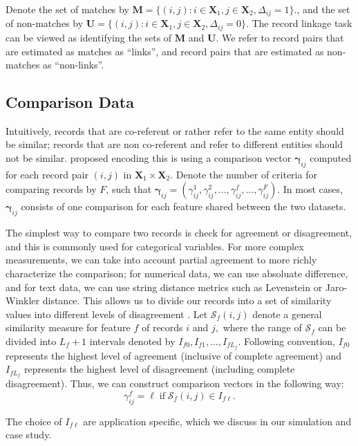 \documentclass[12pt,letterpaper]{article}
\newcommand{\1}[1]{\mathbb{I}\!\left[#1\right]} %
\begin{document}
Denote the set of matches by $\bm{M} = \{(i,j): i \in \bm{X}_1, j \in \bm{X}_2, \Delta_{ij} = 1\}.$, and the set of non-matches by 
$\bm{U} =  \{(i,j): i \in \bm{X}_1, j \in \bm{X}_2, \Delta_{ij} = 0\}.$ The record linkage task can be viewed as identifying the sets of  $\bm{M}$ and  $\bm{U}.$ We refer to record pairs that are estimated as matches as ``links'', and record pairs that are estimated as non-matches as ``non-links''.

\subsection{Comparison Data}

Intuitively, records that are co-referent or rather refer to the same entity should be similar; records that are non co-referent and refer to different entities should not be similar. \cite{fellegi_theory_1969} proposed encoding this is using a comparison vector $\bm{\gamma}_{ij}$ computed for each record pair $(i,j)$ in $\bm{X}_1 \times \bm{X}_2.$ Denote the number of criteria for comparing records by $F$, such that 
$\bm{\gamma}_{ij} = (\gamma_{ij}^1, \gamma_{ij}^2, \ldots, \gamma_{ij}^f, \ldots, \gamma_{ij}^F).$ In most cases, $\bm{\gamma}_{ij}$ consists of one comparison for each feature shared between the two datasets. 

The simplest way to compare two records is check for agreement or disagreement, and this is commonly used for categorical variables. For more complex measurements, we can take into account partial agreement to more richly characterize the comparison; for numerical data, we can use absoluate difference, and for text data, we can use string distance metrics such as Levenstein or Jaro-Winkler distance. This allows us to divide our records into a set of similarity values into different levels of disagreement \citep{bilenko2006riddle, elmagarmid_duplicate_2007}. Let $\mathcal{S}_f(i,j)$ denote a general similarity measure for feature $f$ of records $i$ and $j,$ where the range of $\mathcal{S}_f$ can be divided into $L_f +1$ intervals denoted by $I_{f0}, I_{f1}, \ldots, I_{fL_f}$. Following convention, $I_{f0}$ represents the highest level of agreement (inclusive of complete agreement) and $I_{fL_f}$ represents the highest level of disagreement (including complete disagreement). Thus, we can construct comparison vectors in the following way: 
$$\gamma_{ij}^f = \ell \; \text{if} \; \mathcal{S}_f(i,j) \in I_{f\ell}.$$

The choice of $I_{f\ell}$ are application specific, which we discuss in our simulation and case study. 
\end{document}
